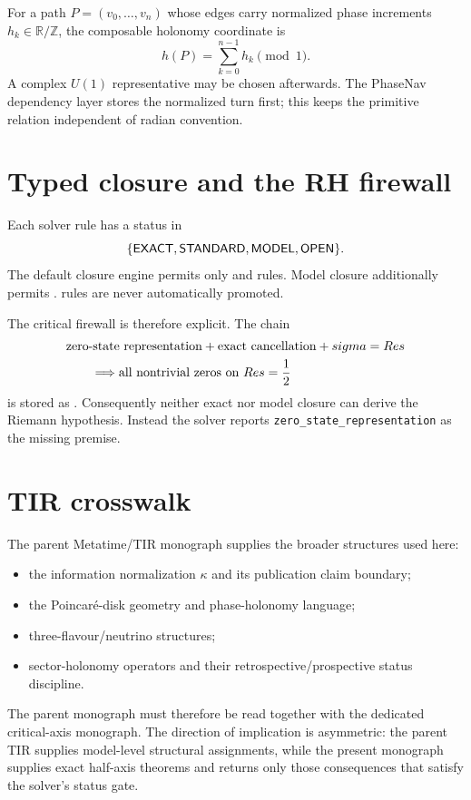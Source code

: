 For a path $P=(v_0,\ldots,v_n)$ whose edges carry normalized phase increments $h_k\in\mathbb R/\mathbb Z$, the composable holonomy coordinate is
\begin{equation}
h(P)=\sum_{k=0}^{n-1}h_k\pmod1.
\label{eq:path-holonomy-turns}
\end{equation}
A complex $U(1)$ representative may be chosen afterwards.  The PhaseNav dependency layer stores the normalized turn first; this keeps the primitive relation independent of radian convention.

\section{Typed closure and the RH firewall}
Each solver rule has a status in
\begin{equation}
\{\textsf{EXACT},\textsf{STANDARD},\textsf{MODEL},\textsf{OPEN}\}.
\end{equation}
The default closure engine permits only  and  rules.  Model closure additionally permits .   rules are never automatically promoted.

The critical firewall is therefore explicit.  The chain
\begin{equation}
\begin{aligned}
&\text{zero-state representation}
+\text{exact cancellation}
+sigma=Re s\\
&\qquad\Longrightarrow
\text{all nontrivial zeros on }Re s=\frac12
\end{aligned}
\end{equation}
is stored as .  Consequently neither exact nor model closure can derive the Riemann hypothesis.  Instead the solver reports \texttt{zero\_state\_representation} as the missing premise.

\section{TIR crosswalk}
The parent Metatime/TIR monograph supplies the broader structures used here:
\begin{itemize}
\item the information normalization $\kappa$ and its publication claim boundary;
\item the Poincar\'e-disk geometry and phase-holonomy language;
\item three-flavour/neutrino structures;
\item sector-holonomy operators and their retrospective/prospective status discipline.
\end{itemize}
The parent monograph must therefore be read together with the dedicated critical-axis monograph.  The direction of implication is asymmetric: the parent TIR supplies model-level structural assignments, while the present monograph supplies exact half-axis theorems and returns only those consequences that satisfy the solver's status gate.

